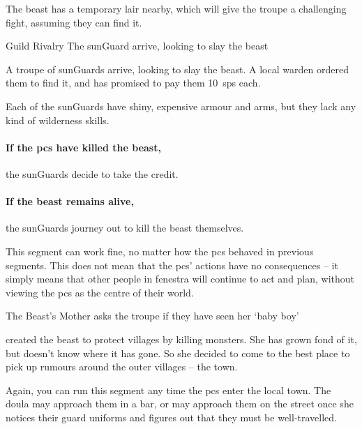 \begin{multicols}{2}
The beast has a temporary lair nearby, which will give the troupe a challenging fight, assuming they can find it.

{Guild Rivalry}%
{The \gls{sunGuard} arrive, looking to slay the beast}%

\begin{exampletext}
  A troupe of \glspl{sunGuard} arrive, looking to slay the beast.
  A local \gls{warden} ordered them to find it, and has promised to pay them 10~\glspl{sp} each.
\end{exampletext}

Each of the \glspl{sunGuard} have shiny, expensive armour and arms, but they lack any kind of wilderness skills.

\paragraph{If the \glspl{pc} have killed the beast,}
the \glspl{sunGuard} decide to take the credit.

\paragraph{If the beast remains alive,}
the \glspl{sunGuard} journey out to kill the beast themselves.

This \gls{segment} can work fine, no matter how the \glspl{pc} behaved in previous \glspl{segment}.
This does not mean that the \glspl{pc}' actions have no consequences -- it simply means that other people in \gls{fenestra} will continue to act and plan, without viewing the \glspl{pc} as the centre of their world.

{The Beast's Mother}%
{ asks the troupe if they have seen her `baby boy'}%

\begin{exampletext}
   created the beast to protect \glspl{village} by killing monsters.
  She has grown fond of it, but doesn't know where it has gone.
  So she decided to come to the best place to pick up rumours around the outer \glspl{village} -- the town.
\end{exampletext}

Again, you can run this \gls{segment} any time the \glspl{pc} enter the local town.
The \gls{doula} may approach them in a bar, or may approach them on the street once she notices their \gls{guard} uniforms and figures out that they must be well-travelled.


\end{multicols}
